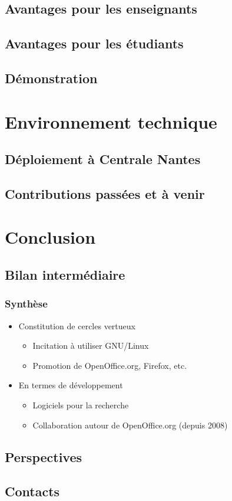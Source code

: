\documentclass[hyperref,french,usenames,xcolor=dvipsnames]{beamer}
\begin{document}

\subsection*{Avantages pour les enseignants}

\subsection*{Avantages pour les étudiants}

\subsection*{Démonstration}

\section*{Environnement technique}

\subsection*{Déploiement à Centrale Nantes}

\subsection*{Contributions passées et à venir}

\section*{Conclusion}

\subsection*{Bilan intermédiaire}

\frame
{
  \frametitle{Synthèse}

\begin{itemize}
\item Constitution de cercles vertueux
\begin{itemize}
\item Incitation à utiliser GNU/Linux
\item Promotion de OpenOffice.org, Firefox, etc.
\end{itemize}
\item En termes de développement
\begin{itemize}
\item Logiciels pour la recherche
\item Collaboration autour de OpenOffice.org (depuis 2008)
\end{itemize}
\end{itemize}
}

\subsection*{Perspectives}

\subsection*{Contacts}

%
%
\end{document}
